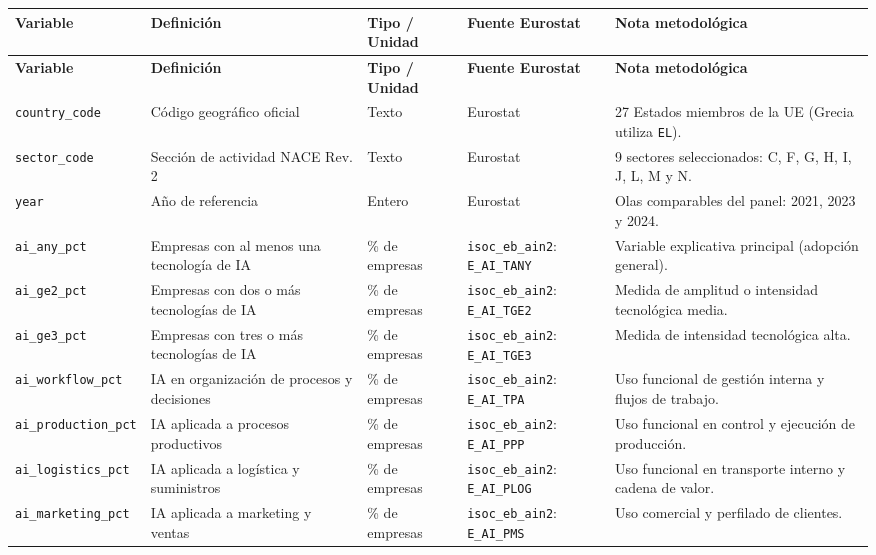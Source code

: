 \documentclass[12pt,a4paper]{article}
\begin{document}
\begingroup
\renewcommand{\arraystretch}{0.80}
\setlength{\tabcolsep}{3.5pt}
\scriptsize
\begin{tabularx}{\textwidth}{lXllX}
\caption{Diccionario de variables de la base analítica}\label{tab:anexo-diccionario} \\
\toprule
\textbf{Variable} & \textbf{Definición} & \textbf{Tipo / Unidad} & \textbf{Fuente Eurostat} & \textbf{Nota metodológica} \\
\midrule
\endfirsthead
\toprule
\textbf{Variable} & \textbf{Definición} & \textbf{Tipo / Unidad} & \textbf{Fuente Eurostat} & \textbf{Nota metodológica} \\
\midrule
\endhead
\texttt{country\_code} & Código geográfico oficial & Texto & Eurostat & 27 Estados miembros de la UE (Grecia utiliza \texttt{EL}). \\
\texttt{sector\_code} & Sección de actividad NACE Rev. 2 & Texto & Eurostat & 9 sectores seleccionados: C, F, G, H, I, J, L, M y N. \\
\texttt{year} & Año de referencia & Entero & Eurostat & Olas comparables del panel: 2021, 2023 y 2024. \\
\texttt{ai\_any\_pct} & Empresas con al menos una tecnología de IA & \% de empresas & \texttt{isoc\_eb\_ain2}: \texttt{E\_AI\_TANY} & Variable explicativa principal (adopción general). \\
\texttt{ai\_ge2\_pct} & Empresas con dos o más tecnologías de IA & \% de empresas & \texttt{isoc\_eb\_ain2}: \texttt{E\_AI\_TGE2} & Medida de amplitud o intensidad tecnológica media. \\
\texttt{ai\_ge3\_pct} & Empresas con tres o más tecnologías de IA & \% de empresas & \texttt{isoc\_eb\_ain2}: \texttt{E\_AI\_TGE3} & Medida de intensidad tecnológica alta. \\
\texttt{ai\_workflow\_pct} & IA en organización de procesos y decisiones & \% de empresas & \texttt{isoc\_eb\_ain2}: \texttt{E\_AI\_TPA} & Uso funcional de gestión interna y flujos de trabajo. \\
\texttt{ai\_production\_pct} & IA aplicada a procesos productivos & \% de empresas & \texttt{isoc\_eb\_ain2}: \texttt{E\_AI\_PPP} & Uso funcional en control y ejecución de producción. \\
\texttt{ai\_logistics\_pct} & IA aplicada a logística y suministros & \% de empresas & \texttt{isoc\_eb\_ain2}: \texttt{E\_AI\_PLOG} & Uso funcional en transporte interno y cadena de valor. \\
\texttt{ai\_marketing\_pct} & IA aplicada a marketing y ventas & \% de empresas & \texttt{isoc\_eb\_ain2}: \texttt{E\_AI\_PMS} & Uso comercial y perfilado de clientes. \\

\end{tabularx}
\end{document}
